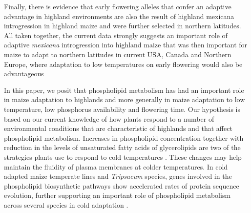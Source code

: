 \documentclass[9pt,twocolumn,twoside,lineno]{gsajnl}
\begin{document}
Finally, there is evidence that early flowering alleles that confer an adaptive advantage in highland environments are also the result of highland mexicana introgression in highland maize \citep{Guo2018-on} and were further selected in northern latitudes. 
All taken together, the current data strongly suggests an important role of adaptive \textit{mexicana} introgression into highland maize that was then important for maize to adapt to northern latitudes in current USA, Canada and Northern Europe, where adaptation to low temperatures on early flowering would also be advantageous    

In this paper, we posit that phospholipid metabolism has had an important role in maize adaptation to highlands and more generally in maize adaptation to low temperature, low phosphorus availability and flowering time.   
Our hypothesis is based on our current knowledge of how plants respond to a number of environmental conditions that are characteristic of highlands and that affect phospholipid metabolism. 
Increases in phospholipid concentration \citep{Degenkolbe2012-wf} together with reduction in the levels of unsaturated fatty acids of glycerolipids \citep{Welti2002-uk} are two of the strategies plants use to respond to cold temperatures \citep{Lynch1987-ln}. 
These changes may help maintain the fluidity of plasma membranes at colder temperatures.
In cold adapted maize temperate lines and \textit{Tripsacum} species, genes involved in the phospholipid biosynthetic pathways show accelerated rates of protein sequence evolution, further supporting an important role of phospholipid metabolism across several species in cold adaptation \cite{Yan2019-tx}. 
 
\end{document}
